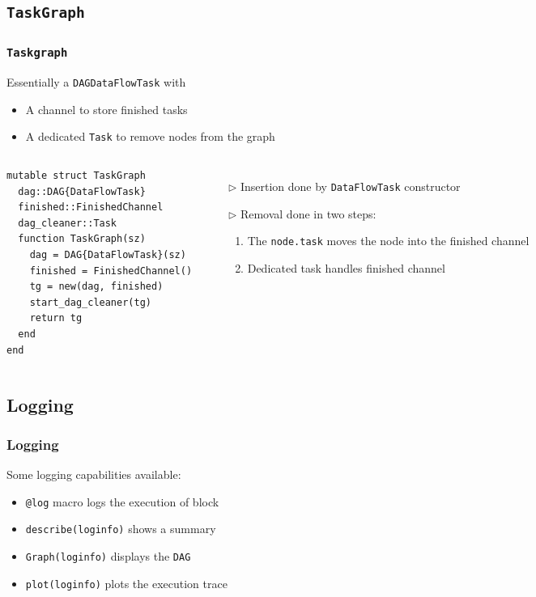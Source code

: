 \documentclass{beamer}
\begin{document}
\subsection{\texttt{TaskGraph}}

\begin{frame}[fragile]
\frametitle{{\texttt{Taskgraph}}}  
  
Essentially a \texttt{DAG{DataFlowTask}} with
\begin{itemize}
  \item A channel to store finished tasks  
  \item A dedicated \texttt{Task} to remove nodes from the graph
\end{itemize}

\hrulefill

\begin{columns}

\begin{verbatim}
mutable struct TaskGraph
  dag::DAG{DataFlowTask}
  finished::FinishedChannel
  dag_cleaner::Task
  function TaskGraph(sz)
    dag = DAG{DataFlowTask}(sz)
    finished = FinishedChannel()
    tg = new(dag, finished)
    start_dag_cleaner(tg)
    return tg
  end
end
\end{verbatim}

\begin{itemize}
  \item[$\triangleright$] Insertion done by \texttt{DataFlowTask} constructor
  \item[$\triangleright$] Removal done in two steps:
  \begin{enumerate}
    \item The \texttt{node.task} moves the node into the finished channel
    \item Dedicated task handles finished channel
  \end{enumerate}
\end{itemize}  

\end{columns}

\end{frame}

\subsection{Logging}

\begin{frame}
\frametitle{Logging}

Some logging capabilities available:
\begin{itemize}
  \item \texttt{@log} macro logs the execution of block
  \item \texttt{describe(loginfo)} shows a summary
  \item \texttt{Graph(loginfo)} displays the \texttt{DAG}
  \item \texttt{plot(loginfo)} plots the execution trace
\end{itemize}

\end{frame}
\end{document}
